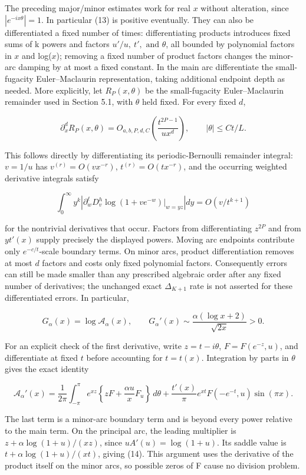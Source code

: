 \documentclass[11pt,letterpaper]{article}
\begin{document}
The preceding major/minor estimates work for real \(x\) without
alteration, since \(|e^{-ix\theta}|=1\). In particular (13) is positive
eventually. They can also be differentiated a fixed number of times:
differentiating products introduces fixed sums of k powers and factors
\(u'/u,\ t',\text{ and }\theta\), all bounded by polynomial factors in
\(x\) and log(\(x\)); removing a fixed number of product factors changes
the minor-arc damping by at most a fixed constant. In the main arc
differentiate the small-fugacity Euler--Maclaurin representation, taking
additional endpoint depth as needed. More explicitly, let
\(R_P(x,\theta)\) be the small-fugacity Euler--Maclaurin remainder used
in Section 5.1, with \(\theta\) held fixed. For every fixed \(d\),

\[
 \partial_x^d R_P(x,\theta)
 =O_{a,b,P,d,C}\left(\frac{t^{2P-1}}{u x^d}\right),
 \qquad |\theta|\le Ct/L. \tag{13a}
\]

This follows directly by differentiating its periodic-Bernoulli
remainder integral: \(v=1/u\) has \(v^{(r)}=O(vx^{-r})\),
\(t^{(r)}=O(tx^{-r})\), and the occurring weighted derivative integrals
satisfy

\[
 \int_0^\infty y^k
 \left|\partial_w^\ell D_v^h\log(1+v e^{-w})\big|_{w=yz}\right|dy
 =O(v/t^{k+1})
\]

for the nontrivial derivatives that occur. Factors from differentiating
\(z^{2P}\) and from \(yt'(x)\) supply precisely the displayed powers.
Moving arc endpoints contribute only \(e^{-c/t}\)-scale boundary terms.
On minor arcs, product differentiation removes at most \(d\) factors and
costs only fixed polynomial factors. Consequently errors can still be
made smaller than any prescribed algebraic order after any fixed number
of derivatives; the unchanged exact \(\Delta_{K+1}\) rate is not
asserted for these differentiated errors. In particular,

\[
 G_\alpha(x)=\log\mathcal A_\alpha(x),\qquad
 G_\alpha'(x)\sim\frac{\alpha(\log x+2)}{\sqrt{2x}}>0. \tag{14}
\]

For an explicit check of the first derivative, write \(z=t-i\theta\),
\(F=F(e^{-z},u)\), and differentiate at fixed \(t\) before accounting
for \(t=t(x)\). Integration by parts in \(\theta\) gives the exact
identity

\[
 \mathcal A_\alpha'(x)=\frac1{2\pi}\int_{-\pi}^{\pi}e^{xz}
 \left\{zF+\frac{\alpha u}{x}F_u\right\}\,d\theta
 +\frac{t'(x)}\pi e^{xt}F(-e^{-t},u)\sin(\pi x). \tag{14a}
\]

The last term is a minor-arc boundary term and is beyond every power
relative to the main term. On the principal arc, the leading multiplier
is \(z+\alpha\log(1+u)/(xz)\), since \(uA'(u)=\log(1+u)\). Its saddle
value is \(t+\alpha\log(1+u)/(xt)\), giving (14). This argument uses the
derivative of the product itself on the minor arcs, so possible zeros of
F cause no division problem.
\end{document}
